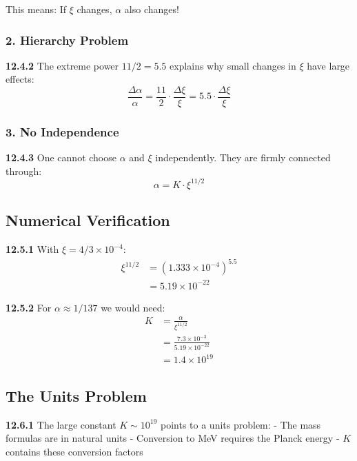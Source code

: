 This means: If $\xi$ changes, $\alpha$ also changes!

\subsubsection{2. Hierarchy Problem}
\noindent \textbf{12.4.2} The extreme power $11/2 = 5.5$ explains why small changes in $\xi$ have large effects:
\begin{equation}
	\frac{\Delta \alpha}{\alpha} = \frac{11}{2} \cdot \frac{\Delta \xi}{\xi} = 5.5 \cdot \frac{\Delta \xi}{\xi}
\end{equation}

\subsubsection{3. No Independence}
\noindent \textbf{12.4.3} One cannot choose $\alpha$ and $\xi$ independently. They are firmly connected through:
\begin{equation}
	\alpha = K \cdot \xi^{11/2}
\end{equation}

\subsection{Numerical Verification}

\noindent \textbf{12.5.1} With $\xi = 4/3 \times 10^{-4}$:
\begin{align}
	\xi^{11/2} &= (1.333 \times 10^{-4})^{5.5} \\
	&= 5.19 \times 10^{-22}
\end{align}

\noindent \textbf{12.5.2} For $\alpha \approx 1/137$ we would need:
\begin{align}
	K &= \frac{\alpha}{\xi^{11/2}} \\
	&= \frac{7.3 \times 10^{-3}}{5.19 \times 10^{-22}} \\
	&= 1.4 \times 10^{19}
\end{align}

\subsection{The Units Problem}

\noindent \textbf{12.6.1} The large constant $K \sim 10^{19}$ points to a units problem:
- The mass formulas are in natural units
- Conversion to MeV requires the Planck energy
- $K$ contains these conversion factors

